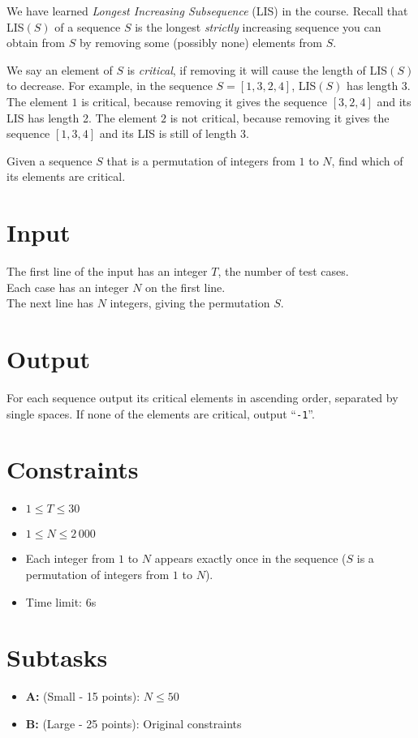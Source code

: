 
We have learned {\it Longest Increasing Subsequence} (LIS) in the course.
Recall that LIS$(S)$ of a sequence $S$ is the longest {\it strictly} increasing sequence you can obtain from $S$ by removing some (possibly none) elements from $S$.

We say an element of $S$ is {\it critical}, if removing it will cause the length of LIS$(S)$ to decrease.
For example, in the sequence $S = [1, 3, 2, 4]$, LIS$(S)$ has length 3.
The element $1$ is critical, because removing it gives the sequence $[3, 2, 4]$ and its LIS has length 2.
The element $2$ is not critical, because removing it gives the sequence $[1, 3, 4]$ and its LIS is still of length 3.

Given a sequence $S$ that is a permutation of integers from $1$ to $N$, find which of its elements are critical.
\section*{Input}

The first line of the input has an integer $T$, the number of test cases.\\
Each case has an integer $N$ on the first line.\\
The next line has $N$ integers, giving the permutation $S$.

\section*{Output}
For each sequence output its critical elements in ascending order, separated by single spaces. If none of the elements are critical, output ``{\tt -1}''.

\section*{Constraints}
\begin{itemize}
\item $1 \leq T\leq 30$
\item $1 \leq N \leq 2\,000$
\item Each integer from $1$ to $N$ appears exactly once in the sequence ($S$ is a permutation of integers from $1$ to $N$).
\item Time limit: 6s
\end{itemize}

\section*{Subtasks}
\begin{itemize}
  \item {\bf A:} (Small - 15 points): $N \leq 50$
  \item {\bf B:} (Large - 25 points): Original constraints
\end{itemize}
